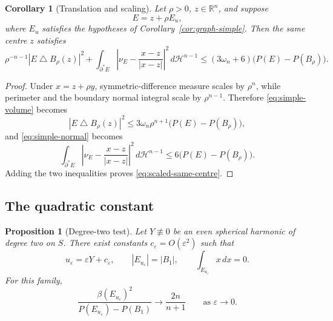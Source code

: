 \documentclass[11pt]{amsart}
\newtheorem{proposition}[theorem]{Proposition}
\newtheorem{corollary}[theorem]{Corollary}
\theoremstyle{definition}
\newcommand{\R}{\mathbb R}
\newcommand{\Hn}{\mathcal H^{n-1}}
\newcommand{\eps}{\varepsilon}
\newcommand{\Per}{P}
\begin{document}
\begin{corollary}[Translation and scaling]\label{cor:scaled-graph}
Let \(\rho>0\), \(z\in\R^n\), and suppose
\[
   E=z+\rho E_u,
\]
where \(E_u\) satisfies the hypotheses of Corollary~\ref{cor:graph-simple}.
Then the same centre \(z\) satisfies
\[
   \rho^{-n-1}|E\mathbin{\triangle}B_\rho(z)|^2
   +
   \int_{\partial^*E}
      \left|\nu_E-\frac{x-z}{|x-z|}\right|^2\,d\Hn
   \le
   (3\omega_n+6)\bigl(\Per(E)-\Per(B_\rho)\bigr).
\tag{3.50}\label{eq:scaled-same-centre}
\]
\end{corollary}

\begin{proof}
Under \(x=z+\rho y\), symmetric-difference measure scales by \(\rho^n\),
while perimeter and the boundary normal integral scale by \(\rho^{n-1}\).
Therefore \eqref{eq:simple-volume} becomes
\[
   |E\mathbin{\triangle}B_\rho(z)|^2
   \le3\omega_n\rho^{n+1}
        \bigl(\Per(E)-\Per(B_\rho)\bigr),
\]
and \eqref{eq:simple-normal} becomes
\[
   \int_{\partial^*E}
      \left|\nu_E-\frac{x-z}{|x-z|}\right|^2\,d\Hn
   \le6\bigl(\Per(E)-\Per(B_\rho)\bigr).
\]
Adding the two inequalities proves \eqref{eq:scaled-same-centre}.
\end{proof}

\subsection{The quadratic constant}

\begin{proposition}[Degree-two test]\label{prop:degree-two}
Let \(Y\not\equiv0\) be an even spherical harmonic of degree two on \(S\).
There exist constants \(c_\eps=O(\eps^2)\) such that
\[
   u_\eps=\eps Y+c_\eps,\qquad
   |E_{u_\eps}|=|B_1|,\qquad
   \int_{E_{u_\eps}}x\,dx=0.
\]
For this family,
\[
   \frac{\beta(E_{u_\eps})^2}
   {\Per(E_{u_\eps})-\Per(B_1)}
   \longrightarrow \frac{2n}{n+1}
   \qquad\text{as }\eps\to0.
\tag{3.51}\label{eq:sharp-constant}
\]
\end{proposition}
\end{document}
